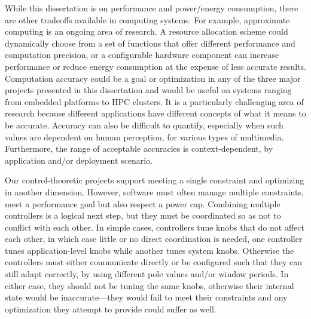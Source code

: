 While this dissertation is on performance and power/energy consumption, there are other tradeoffs available in computing systems.
For example, approximate computing is an ongoing area of research.
A resource allocation scheme could dynamically choose from a set of functions that offer different performance and computation precision, or a configurable hardware component can increase performance or reduce energy consumption at the expense of less accurate results.
Computation accuracy could be a goal or optimization in any of the three major projects presented in this dissertation and would be useful on systems ranging from embedded platforms to HPC clusters.
It is a particularly challenging area of research because different applications have different concepts of what it means to be accurate.
Accuracy can also be difficult to quantify, especially when such values are dependent on human perception, \eg for various types of multimedia.
Furthermore, the range of acceptable accuracies is context-dependent, \eg by application and/or deployment scenario.

Our control-theoretic projects support meeting a single constraint and optimizing in another dimension.
However, software must often manage multiple constraints, \eg meet a performance goal but also respect a power cap.
Combining multiple controllers is a logical next step, but they must be coordinated so as not to conflict with each other.
In simple cases, controllers tune knobs that do not affect each other, in which case little or no direct coordination is needed, \eg one controller tunes application-level knobs while another tunes system knobs.
Otherwise the controllers must either communicate directly or be configured such that they can still adapt correctly, \eg by using different pole values and/or window periods.
In either case, they should not be tuning the same knobs, otherwise their internal state would be inaccurate---they would fail to meet their constraints and any optimization they attempt to provide could suffer as well.


